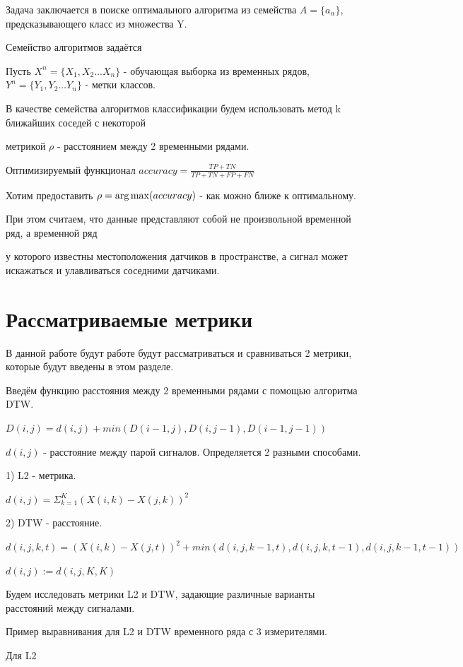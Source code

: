 \documentclass[12pt, twoside]{article}
\begin{document}
Задача заключается в поиске оптимального алгоритма из семейства $A = \{a_{\alpha}\}$, предсказывающего класс из множества Y.

Семейство алгоритмов задаётся 

Пусть $X^n = \{X_1, X_2 \dots X_n\}$ - обучающая выборка из временных рядов, $Y^n = \{Y_1, Y_2 \dots Y_n\}$ - метки классов.

В качестве семейства алгоритмов классификации будем использовать метод k ближайших соседей с некоторой

метрикой $\rho$ - расстоянием между 2 временными рядами.

Оптимизируемый функционал $accuracy = \frac{TP + TN}{TP + TN + FP + FN}$

Хотим предоставить $\rho = \argmax(accuracy)$ - как можно ближе к оптимальному.

При этом считаем, что данные представляют собой не произвольной временной ряд, а временной ряд

у которого известны местоположения датчиков в пространстве, а сигнал может искажаться и улавливаться соседними датчиками.


\section{Рассматриваемые метрики}

В данной работе будут работе будут рассматриваться и сравниваться 2 метрики, которые будут введены в этом разделе.

Введём функцию расстояния между 2 временными рядами с помощью алгоритма DTW.

$D(i, j) = d(i, j) + min(D(i - 1, j), D(i, j - 1), D(i - 1, j - 1))$

$d(i, j)$ - расстояние между парой сигналов. Определяется 2 разными способами.

1) L2 - метрика.

$d(i, j) = \Sigma_{k = 1}^K(X(i, k) - X(j, k))^2$

2) DTW - расстояние.

$d(i, j, k, t) = (X(i, k) - X(j, t)) ^ 2 + min(d(i, j, k - 1, t), d(i, j, k, t - 1), d(i, j, k - 1, t - 1))$

$d(i, j) := d(i, j, K, K)$

Будем исследовать метрики L2 и DTW, задающие различные варианты расстояний между сигналами. 

Пример выравнивания для L2 и DTW временного ряда с 3 измерителями.

Для L2
\end{document}
